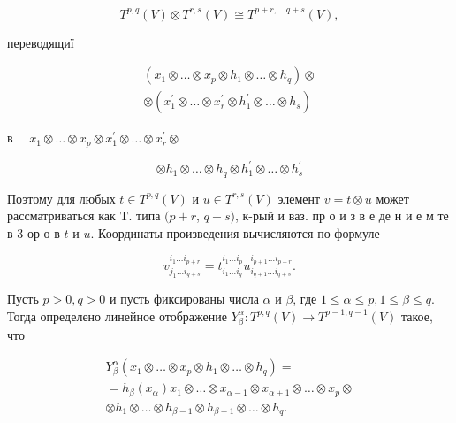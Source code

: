 \documentclass[10pt]{article}
\begin{document}
\[

T^{p, q}(V) \otimes T^{r, s}(V) \cong T^{p+r, \quad q+s}(V),

\]



переводящиї



\[

\begin{gathered}

\left(x_{1} \otimes \ldots \otimes x_{p} \otimes h_{1} \otimes \ldots \otimes h_{q}\right) \otimes \\

\otimes\left(x_{1}^{\prime} \otimes \ldots \otimes x_{r}^{\prime} \otimes h_{1}^{\prime} \otimes \ldots \otimes h_{s}\right)

\end{gathered}

\]



в $\quad x_{1} \otimes \ldots \otimes x_{p} \otimes x_{1}^{\prime} \otimes \ldots \otimes x_{r}^{\prime} \otimes$



\[

\otimes h_{1} \otimes \ldots \otimes h_{q} \otimes h_{1}^{\prime} \otimes \ldots \otimes h_{s}^{\prime}

\]



Поэтому для любых $t \in T^{p, q}(V)$ и $u \in T^{r, s}(V)$ элемент $v=t \otimes u$ может рассматриваться как $\mathrm{T}$. типа $(p+r$, $q+s)$, к-рый и ваз. пр о и з в е де н и е м те в 3 ор о в $t$ и $u$. Координаты произведения вычисляются по формуле



\[

v_{j_{1} \ldots i_{q+s}}^{i_{1} \ldots i_{p+r}}=t_{i_{1} \ldots i_{q}}^{i_{1} \ldots i_{p}} u_{i_{q+1} \ldots i_{q+s}}^{i_{p+1} \ldots i_{p+r}} .

\]



Пусть $p>0, q>0$ и пусть фиксированы числа $\alpha$ и $\beta$, где $1 \leqslant \alpha \leqslant p, 1 \leqslant \beta \leqslant q$. Тогда определено линейное отображение $Y_{\beta}^{\alpha}: T^{p, q}(V) \rightarrow T^{p-1, q-1}(V)$ такое, что



\[

\begin{gathered}

Y_{\beta}^{\alpha}\left(x_{1} \otimes \ldots \otimes x_{p} \otimes h_{1} \otimes \ldots \otimes h_{q}\right)= \\

=h_{\beta}\left(x_{\alpha}\right) x_{1} \otimes \ldots \otimes x_{\alpha-1} \otimes x_{\alpha+1} \otimes \ldots \otimes x_{p} \otimes \\

\otimes h_{1} \otimes \ldots \otimes h_{\beta-1} \otimes h_{\beta+1} \otimes \ldots \otimes h_{q} .

\end{gathered}

\]
\end{document}
